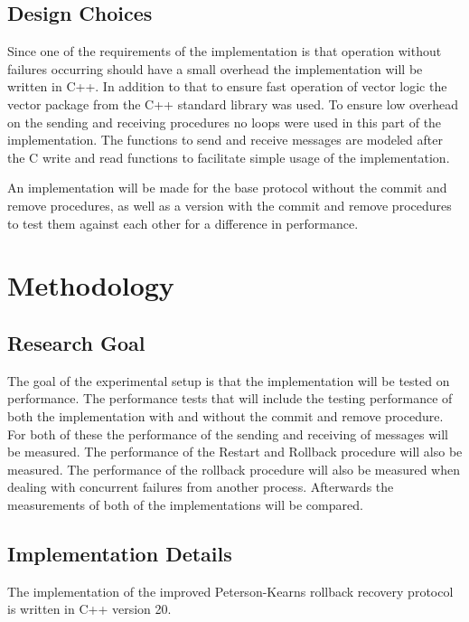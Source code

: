 \documentclass[twocolumn, a4paper,11pt]{article}%
\begin{document}
\subsection{Design Choices}
Since one of the requirements of the implementation is that operation without failures occurring should have a small overhead the implementation will be written in C++. In addition to that to ensure fast operation of vector logic the vector package from the C++ standard library was used. To ensure low overhead on the sending and receiving procedures no loops were used in this part of the implementation. The functions to send and receive messages are modeled after the C write and read functions to facilitate simple usage of the implementation.
\par An implementation will be made for the base protocol without the commit and remove procedures, as well as a version with the commit and remove procedures to test them against each other for a difference in performance. 

\section{Methodology}

\subsection{Research Goal}
\par The goal of the experimental setup is that the implementation will be tested on performance.  The performance tests that will include the testing performance of both the implementation with and without the commit and remove procedure. For both of these the performance of the sending and receiving of messages will be measured. The performance of the Restart and Rollback procedure will also be measured. The performance of the rollback procedure will also be measured when dealing with concurrent failures from another process. Afterwards the measurements of both of the implementations will be compared.

\subsection{Implementation Details}
\par The implementation of the improved Peterson-Kearns rollback recovery protocol is written in C++ version 20.
\end{document}
